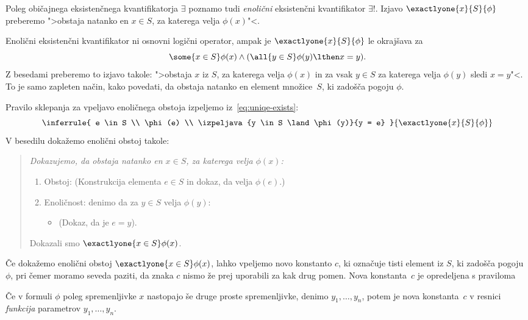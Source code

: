 Poleg običajnega eksistenčnega kvantifikatorja $\exists$ poznamo tudi
\emph{enolični} eksistenčni kvantifikator $\exists!$. Izjavo
$\exactlyone{x}{S}{\phi}$ preberemo ">obstaja natanko en $x \in S$, za
katerega velja $\phi(x)$"<.

Enolični eksistenčni kvantifikator ni osnovni logični operator, ampak
je $\exactlyone{x}{S}{\phi}$ le okrajšava za
%
\begin{equation}
  \label{eq:uniqe-exists}
  \some{x \in S} \phi(x) \land (\all{y \in S} \phi(y) \lthen x = y).
\end{equation}
%
Z besedami preberemo to izjavo takole: ">obstaja $x$ iz $S$, za
katerega velja $\phi(x)$ in za vsak $y \in S$ za katerega velja
$\phi(y)$ sledi $x = y$"<. To je samo zapleten način, kako povedati,
da obstaja natanko en element množice~$S$, ki zadošča pogoju $\phi$.

Pravilo sklepanja za vpeljavo enoličnega obstoja izpeljemo
iz~\eqref{eq:uniqe-exists}:
%
\begin{equation*}
  \inferrule{
    e \in S
    \\
    \phi(e)
    \\
    \izpeljava{y \in S \land \phi(y)}{y = e}
  }
  {\exactlyone{x}{S}{\phi}}
\end{equation*}
%
V besedilu dokažemo enolični obstoj takole:
%
\begin{quote}
  \it
  Dokazujemo, da obstaja natanko en $x \in S$, za katerega velja
  $\phi(x)$:
  \begin{enumerate}
  \item Obstoj: (Konstrukcija elementa $e \in S$ in dokaz, da velja $\phi(e)$.)
  \item Enoličnost: denimo da za $y \in S$ velja $\phi(y)$:
    \begin{itemize}
    \item[] (Dokaz, da je $e = y$).
    \end{itemize}
  \end{enumerate}
  Dokazali smo $\exactlyone{x \in S} \phi(x)$.
\end{quote}

Če dokažemo enolični obstoj $\exactlyone{x \in S} \phi(x)$, lahko
vpeljemo novo konstanto $c$, ki označuje tisti element iz $S$, ki
zadošča pogoju~$\phi$, pri čemer moramo seveda paziti, da znaka $c$
nismo že prej uporabili za kak drug pomen. Nova konstanta~$c$ je
opredeljena s praviloma
%
%
Če v formuli $\phi$ poleg spremenljivke $x$ nastopajo še druge proste
spremenljivke, denimo $y_1, \ldots, y_n$, potem je nova konstanta~$c$
v resnici \emph{funkcija} parametrov $y_1, \ldots, y_n$.


